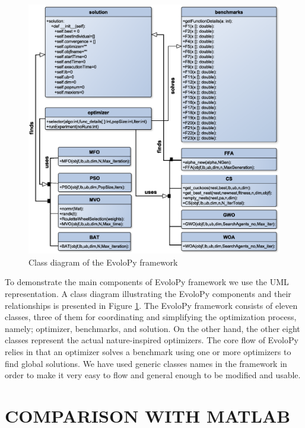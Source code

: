\documentclass[a4paper,twoside]{article}
\begin{document}
\begin{figure}
\centerline{\includegraphics[scale=0.35]{classD.eps}}
\caption{Class diagram of the EvoloPy framework}
\label{fig:framework}
\end{figure}

To demonstrate the main components of EvoloPy framework we use the UML representation. A class diagram illustrating the EvoloPy components and their relationships is presented in Figure \ref{fig:framework}. The EvoloPy framework consists of eleven classes, three of them for coordinating and simplifying the optimization process, namely; optimizer, benchmarks, and solution. On the other hand, the other eight classes represent the actual nature-inspired optimizers. The core flow of EvoloPy relies in that an optimizer solves a benchmark using one or more optimizers to find global solutions. We have used generic classes names in the framework in order to make it very easy to flow and general enough to be modified and usable. 




\section{\uppercase{Comparison with Matlab}}
\end{document}
